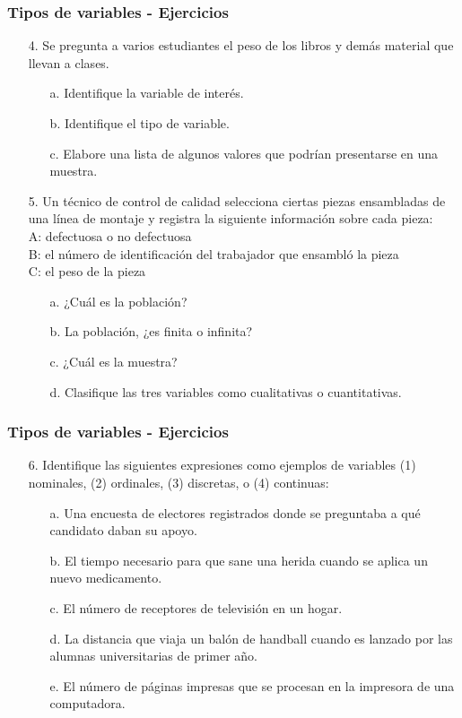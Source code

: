 \documentclass[10pt]{beamer}
\theoremstyle{plain} %
\theoremstyle{definition}
\theoremstyle{remark}
\begin{document}
\begin{frame}
\frametitle{Tipos de variables - Ejercicios}
\begin{itemize}
\justifying
\item[4.]Se pregunta a varios estudiantes el peso de los libros y demás material que llevan a clases.\\

\begin{itemize}
\item[a.]Identifique la variable de interés.
\item[b.]Identifique el tipo de variable.
\item[c.]Elabore una lista de algunos valores que podrían presentarse en una muestra.

\end{itemize}
\item[5.]Un técnico de control de calidad selecciona ciertas piezas ensambladas de una línea de montaje y registra la siguiente información sobre cada pieza:\\
A: defectuosa o no defectuosa\\
B: el número de identificación del trabajador que ensambló la pieza\\
C: el peso de la pieza\\
\begin{itemize}
\item[a.]¿Cuál es la población?
\item[b.]La población, ¿es finita o infinita?
\item[c.]¿Cuál es la muestra?
\item[d.]Clasifique las tres variables como cualitativas o cuantitativas.

\end{itemize}
\end{itemize} 
\end{frame}

\begin{frame}
\frametitle{Tipos de variables - Ejercicios}
\begin{itemize}
\justifying
\item[6.]Identifique las siguientes expresiones como ejemplos de variables (1) nominales, (2) ordinales, (3) discretas, o (4) continuas:\\

\begin{itemize}
\item[a.]Una encuesta de electores registrados donde se preguntaba a qué candidato daban su apoyo.
\item[b.]El tiempo necesario para que sane una herida cuando se aplica un nuevo medicamento.
\item[c.]El número de receptores de televisión en un hogar.
\item[d.]La distancia que viaja un balón de handball cuando es lanzado por las alumnas universitarias de primer año.
\item[e.]El número de páginas impresas que se procesan en la impresora de una computadora.

\end{itemize}
\end{itemize} 
\end{frame}
\end{document}
